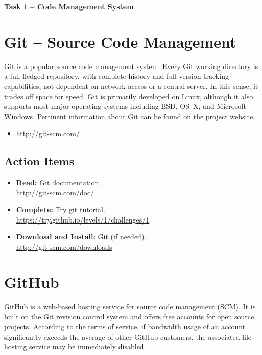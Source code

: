 \documentclass[letterpaper,11pt]{article}
\begin{document}
\begin{center}
{\bfseries \LARGE Task 1 -- Code Management System\\[8mm]}
\end{center}


\section{Git -- Source Code Management}

Git is a popular source code management system.
Every Git working directory is a full-fledged repository, with complete history and full version tracking capabilities, not dependent on network access or a central server.
In this sense, it trades off space for speed.
Git is primarily developed on Linux, although it also supports most major operating systems including BSD, OS~X, and Microsoft Windows.
Pertinent information about Git can be found on the project website.
\begin{itemize}
\item \url{http://git-scm.com/}
\end{itemize}


\subsection*{Action Items}

\begin{itemize}
\item \textbf{Read:} Git documentation. \\
\url{http://git-scm.com/doc/}
\item \textbf{Complete:} Try git tutorial. \\
\url{https://try.github.io/levels/1/challenges/1}
\item \textbf{Download and Install:} Git (if needed). \\
\url{http://git-scm.com/downloads}
\end{itemize}


\section{GitHub}

GitHub is a web-based hosting service for source code management (SCM).
It is built on the Git revision control system and offers free accounts for open source projects.
According to the terms of service, if bandwidth usage of an account significantly exceeds the average of other GitHub customers, the associated file hosting service may be immediately disabled.
\end{document}

